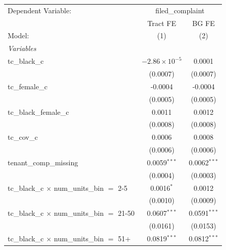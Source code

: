 \begingroup
\centering
\begin{tabular}{lcc}
   \tabularnewline \midrule \midrule
   Dependent Variable: & \multicolumn{2}{c}{filed\_complaint}\\
                                                         & Tract FE                & BG FE \\   
   Model:                                                & (1)                     & (2)\\  
   \midrule
   \emph{Variables}\\
   tc\_black\_c                                          & $-2.86\times 10^{-5}$   & 0.0001\\   
                                                         & (0.0007)                & (0.0007)\\   
   tc\_female\_c                                         & -0.0004                 & -0.0004\\   
                                                         & (0.0005)                & (0.0005)\\   
   tc\_black\_female\_c                                  & 0.0011                  & 0.0012\\   
                                                         & (0.0008)                & (0.0008)\\   
   tc\_cov\_c                                            & 0.0006                  & 0.0008\\   
                                                         & (0.0006)                & (0.0006)\\   
   tenant\_comp\_missing                                 & 0.0059$^{***}$          & 0.0062$^{***}$\\   
                                                         & (0.0004)                & (0.0003)\\   
   tc\_black\_c $\times$ num\_units\_bin $=$ 2-5         & 0.0016$^{*}$            & 0.0012\\   
                                                         & (0.0010)                & (0.0009)\\   
   tc\_black\_c $\times$ num\_units\_bin $=$ 21-50       & 0.0607$^{***}$          & 0.0591$^{***}$\\   
                                                         & (0.0161)                & (0.0153)\\   
   tc\_black\_c $\times$ num\_units\_bin $=$ 51+         & 0.0819$^{***}$          & 0.0812$^{***}$\\   

\end{tabular}
